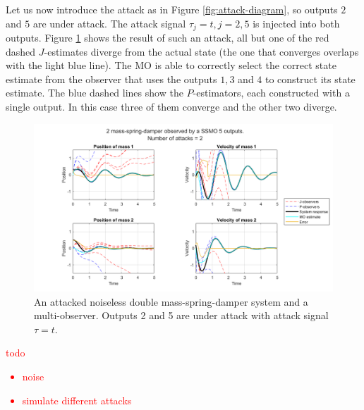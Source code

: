Let us now introduce the attack as in Figure \ref{fig:attack-diagram}, so outputs $2$ and $5$ are under attack. The attack signal $\tau_j=t,j=2,5$ is injected into both outputs. Figure \ref{fig:attacked-system-plot} shows the result of such an attack, all but one of the red dashed $J$-estimates diverge from the actual state (the one that converges overlaps with the light blue line). The MO is able to correctly select the correct state estimate from the observer that uses the outputs $1,3$ and $4$ to construct its state estimate. The blue dashed lines show the $P$-estimators, each constructed with a single output. In this case three of them converge and the other two diverge. 
\newpage
\begin{figure}[H]
    \centering
    \includegraphics[width=\linewidth]{report/Figures/symplot_5o2a}
    \caption{An attacked noiseless double mass-spring-damper system and a multi-observer. Outputs 2 and 5 are under attack with attack signal $\tau=t$.} 
    \label{fig:attacked-system-plot}
\end{figure}

\textcolor{red}{todo
\begin{itemize}
    \item noise
    \item simulate different attacks
\end{itemize}
}